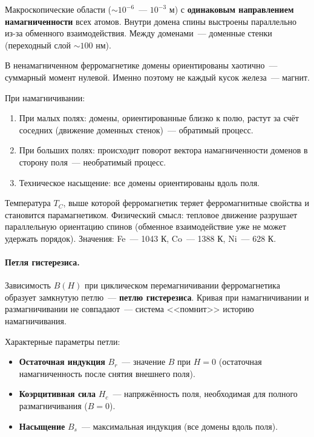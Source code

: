 \documentclass[12pt]{article}
\begin{document}
\begin{definition}[Домены]
    Макроскопические области ($\sim 10^{-6}$~--- $10^{-3}$ м) с
    \textbf{одинаковым направлением намагниченности} всех атомов. Внутри
    домена спины выстроены параллельно из-за обменного взаимодействия.
    Между доменами~--- доменные стенки (переходный слой $\sim 100$ нм).

    В ненамагниченном ферромагнетике домены ориентированы хаотично~---
    суммарный момент нулевой. Именно поэтому не каждый кусок железа~---
    магнит.

    При намагничивании:
    \begin{enumerate}
        \item При малых полях: домены, ориентированные близко к полю, растут
              за счёт соседних (движение доменных стенок)~--- обратимый процесс.
        \item При больших полях: происходит поворот вектора намагниченности
              доменов в сторону поля~--- необратимый процесс.
        \item Техническое насыщение: все домены ориентированы вдоль поля.
    \end{enumerate}
\end{definition}

\begin{definition}
    Температура $T_C$, выше которой ферромагнетик теряет ферромагнитные
    свойства и становится парамагнетиком. Физический смысл: тепловое движение
    разрушает параллельную ориентацию спинов (обменное взаимодействие уже не
    может удержать порядок). Значения: Fe~--- 1043 К, Co~--- 1388 К,
    Ni~--- 628 К.
\end{definition}

\paragraph{Петля гистерезиса.}

Зависимость $B(H)$ при циклическом перемагничивании ферромагнетика образует
замкнутую петлю~--- \textbf{петлю гистерезиса}. Кривая при намагничивании и
размагничивании не совпадают~--- система <<помнит>> историю намагничивания.

Характерные параметры петли:
\begin{itemize}
    \item \textbf{Остаточная индукция} $B_r$~--- значение $B$ при $H = 0$
          (остаточная намагниченность после снятия внешнего поля).
    \item \textbf{Коэрцитивная сила} $H_c$~--- напряжённость поля,
          необходимая для полного размагничивания ($B = 0$).
    \item \textbf{Насыщение} $B_s$~--- максимальная индукция (все домены
          вдоль поля).
\end{itemize}
\end{document}

